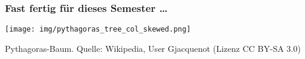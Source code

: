   \begin{frame}
    \frametitle{Fast fertig für dieses Semester \dots}
    
    \begin{center}
      \texttt{[image: img/pythagoras\_tree\_col\_skewed.png]}
      \par
      \begin{footnotesize}
        Pythagoras-Baum. Quelle: Wikipedia, User Gjacquenot (Lizenz CC BY-SA 3.0)
        \par
      \end{footnotesize}
    \end{center}
    
    \parII
    \begin{center}
      \begin{LARGE}
      \end{LARGE}
    \end{center}

  \end{frame}
%
%
%    
%
%      
%
%  
%
